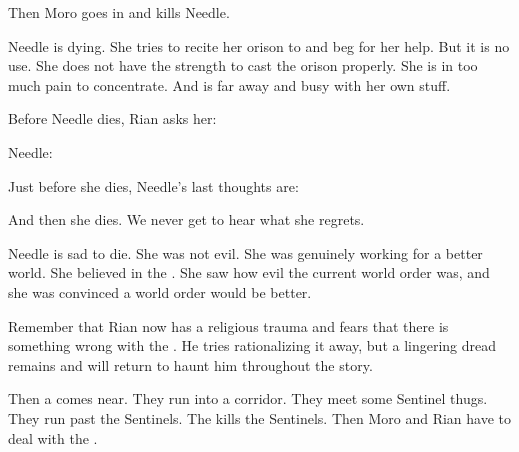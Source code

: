 Then Moro goes in and kills Needle. 





\begin{comment}
  \subsection{Needle dies}
\end{comment}
\new 
Needle is dying. 
She tries to recite her orison to \Achsah and beg for her help.
But it is no use. 
She does not have the strength to cast the orison properly.
She is in too much pain to concentrate.
And \Achsah is far away and busy with her own stuff. 

Before Needle dies, Rian asks her: 

Needle: 

Just before she dies, Needle's last thoughts are: 

And then she dies. 
We never get to hear what she regrets. 

Needle is sad to die. 
She was not evil.
She was genuinely working for a better world. 
She believed in the \resphain.
She saw how evil the current world order was, and she was convinced a \resphan world order would be better. 

Remember that Rian now has a religious trauma and fears that there is something wrong with the \sephiroth. 
He tries rationalizing it away, but a lingering dread remains and will return to haunt him throughout the story. 







\begin{comment}
  \section{Moro and Rian attacked by Bane}
\end{comment}
\new 
Then a \bane comes near. 
They run into a corridor. 
They meet some Sentinel thugs.
They run past the Sentinels.
The \bane kills the Sentinels.
Then Moro and Rian have to deal with the \bane. 

